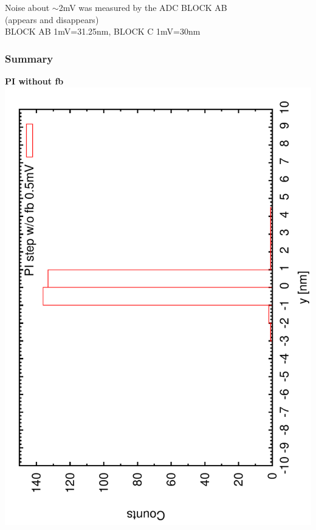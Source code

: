 \documentclass[a4paper,11pt]{book}
\begin{document}
Noise about $\sim$2mV was measured by the ADC BLOCK AB\\
 (appears and disappears)\\
{\tiny BLOCK AB 1mV=31.25nm, BLOCK C 1mV=30nm}\par


 \raggedright
\subsubsection{Summary}
\textbf{PI without  fb}\\
\includegraphics[angle=-90,scale=0.15]{imagestep21.pdf}
\end{document}
